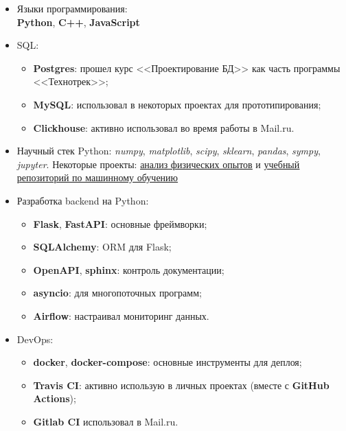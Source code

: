 \begin{itemize}
	\item Языки программирования: \\
        \textbf{Python}, \textbf{C++}, \textbf{JavaScript}
    \item SQL:
        \begin{itemize}
            \item \textbf{Postgres}: прошел курс <<Проектирование БД>> как часть программы <<Технотрек>>;
            \item \textbf{MySQL}: использовал в некоторых проектах для прототипирования;
            \item \textbf{Clickhouse}: активно использовал во время работы в Mail.ru.
        \end{itemize}
    \item Научный стек Python: \textit{numpy}, \textit{matplotlib}, \textit{scipy}, \textit{sklearn}, \textit{pandas}, \textit{sympy}, \textit{jupyter}.
    Некоторые проекты: \href{https://github.com/alekseik1/phys\_labs}{\underline{анализ физических опытов}} и \href{https://github.com/alekseik1/machine\_learning\_coursera}{\underline{учебный репозиторий по машинному обучению}}
    \item Разработка backend на Python:
        \begin{itemize}
            \item \textbf{Flask}, \textbf{FastAPI}: основные фреймворки;
            \item \textbf{SQLAlchemy}: ORM для Flask;
            \item \textbf{OpenAPI}, \textbf{sphinx}: контроль документации;
            \item \textbf{asyncio}: для многопоточных программ;
            \item \textbf{Airflow}: настраивал мониторинг данных.
        \end{itemize}
    \item DevOps:
        \begin{itemize}
            \item \textbf{docker}, \textbf{docker-compose}: основные инструменты для деплоя;
            \item \textbf{Travis CI}: активно использую в личных проектах (вместе с \textbf{GitHub Actions});
            \item \textbf{Gitlab CI} использовал в Mail.ru.
        \end{itemize}
\end{itemize}

